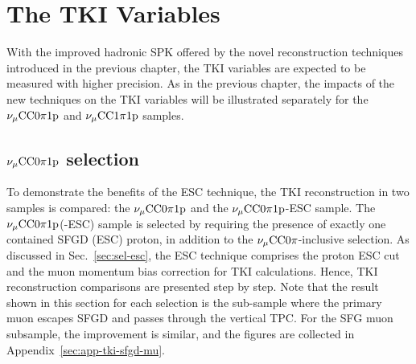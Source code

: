 \section{The TKI Variables}
\label{sec:mc-tki}
     With the improved hadronic SPK offered by the novel reconstruction techniques introduced in the previous chapter, the TKI variables are expected to be measured with higher precision. As in the previous chapter, the impacts of the new techniques on the TKI variables will be illustrated separately for the $\nu_{\mu}\textrm{CC}0\pi1\textrm{p}$ and $\nu_{\mu}\textrm{CC}1\pi1\textrm{p}$ samples.

     \subsection{$\nu_{\mu}\textrm{CC}0\pi1\textrm{p}$ selection}
     \label{sec:mc-tki-0pi}
          To demonstrate the benefits of the ESC technique, the TKI reconstruction in two samples is compared: the $\nu_{\mu}\textrm{CC}0\pi1\textrm{p}$ and the $\nu_{\mu}\textrm{CC}0\pi1\textrm{p}$-ESC sample.
          The $\nu_{\mu}\textrm{CC}0\pi1\textrm{p}$(-ESC) sample is selected by requiring the presence of exactly one contained SFGD (ESC) proton, in addition to the $\nu_{\mu}\textrm{CC}0\pi$-inclusive selection.
          As discussed in Sec.~\ref{sec:sel-esc}, the ESC technique comprises the proton ESC cut and the muon momentum bias correction for TKI calculations.
          Hence, TKI reconstruction comparisons are presented step by step.
          Note that the result shown in this section for each selection is the sub-sample where the primary muon escapes SFGD and passes through the vertical TPC. 
          For the SFG muon subsample, the improvement is similar, and the figures are collected in Appendix~\ref{sec:app-tki-sfgd-mu}.

